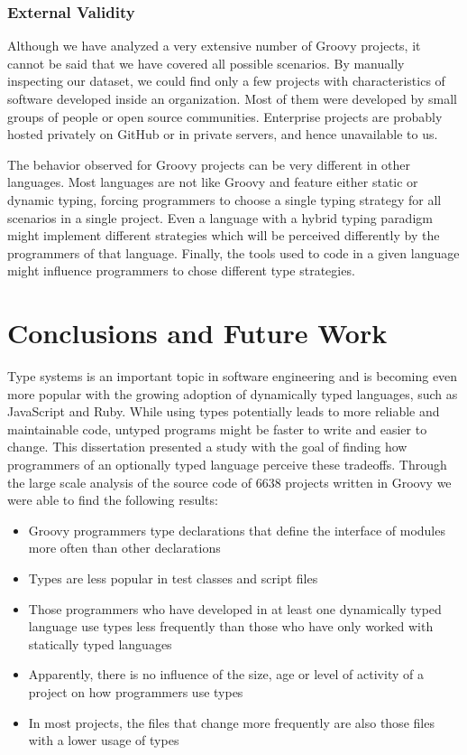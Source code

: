 \documentclass[msc]{ppgccufmg}
\begin{document}
\subsection*{External Validity}
Although we have analyzed a very extensive number of Groovy projects, it cannot be said that we have covered all possible scenarios.
By manually inspecting our dataset, we could find only a few projects with characteristics of software developed inside an organization.
Most of them were developed by small groups of people or open source communities.
Enterprise projects are probably hosted privately on GitHub or in private servers, and hence unavailable to us.

The behavior observed for Groovy projects can be very different in other languages.
Most languages are not like Groovy and feature either static or dynamic typing, forcing programmers to choose a single typing strategy for all scenarios in a single project.
Even a language with a hybrid typing paradigm might implement different strategies which will be perceived differently by the programmers of that language.
Finally, the tools used to code in a given language might influence programmers to chose different type strategies.











%
%
\chapter{Conclusions and Future Work\label{conclusion}}
Type systems is an important topic in software engineering and is becoming even more popular with the growing adoption of dynamically typed languages, such as JavaScript and Ruby.
While using types potentially leads to more reliable and maintainable code, untyped programs might be faster to write and easier to change.
This dissertation presented a study with the goal of finding how programmers of an optionally typed language perceive these tradeoffs.
Through the large scale analysis of the source code of 6638 projects written in Groovy we were able to find the following results:

\begin{itemize}
	\item Groovy programmers type declarations that define the interface of modules more often than other declarations
	\item Types are less popular in test classes and script files
	\item Those programmers who have developed in at least one dynamically typed language use types less frequently than those who have only worked with statically typed languages
	\item Apparently, there is no influence of the size, age or level of activity of a project on how programmers use types
	\item In most projects, the files that change more frequently are also those files with a lower usage of types
\end{itemize}
\end{document}

